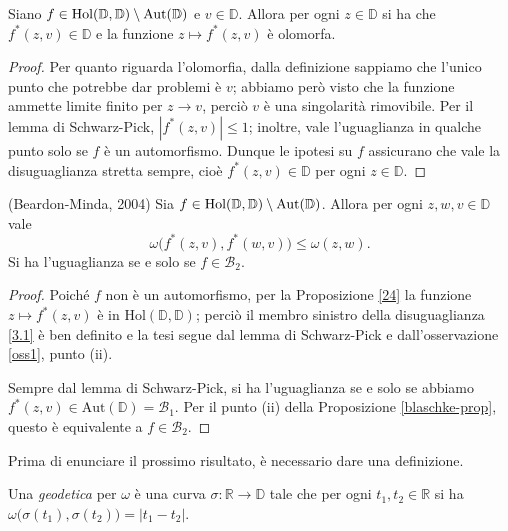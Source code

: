\begin{prop} \label{24}
  Siano $f \in \text{\normalfont{Hol}}(\mathbb{D},\mathbb{D})\setminus\text{\normalfont{Aut}}(\mathbb{D})$ e $v \in \mathbb{D}$. Allora per ogni $z \in \mathbb{D}$ si ha che $f^*(z,v) \in \mathbb{D}$ e la funzione $z \longmapsto f^*(z,v)$ è olomorfa.
\end{prop}

\begin{proof}
  Per quanto riguarda l'olomorfia, dalla definizione sappiamo che l'unico punto che potrebbe dar problemi è $v$; abbiamo però visto che la funzione ammette limite finito per $z \longrightarrow v$, perciò $v$ è una singolarità rimovibile. Per il lemma di Schwarz-Pick, $|f^*(z,v)| \le 1$; inoltre, vale l'uguaglianza in qualche punto solo se $f$ è un automorfismo. Dunque le ipotesi su $f$ assicurano che vale la disuguaglianza stretta sempre, cioè $f^*(z,v) \in \mathbb{D}$ per ogni $z \in \mathbb{D}$.
\end{proof}

\begin{thm} \label{31}
  (Beardon-Minda, 2004) Sia $f \in \text{\normalfont{Hol}}(\mathbb{D},\mathbb{D})\setminus\text{\normalfont{Aut}}(\mathbb{D})$. Allora per ogni $z, w, v \in \mathbb{D}$ vale
  \begin{equation} \label{3.1}
    \omega\bigl(f^*(z,v),f^*(w,v)\bigr) \le \omega(z,w).
  \end{equation}
  Si ha l'uguaglianza se e solo se $f \in \mathcal{B}_2$.
\end{thm}

\begin{proof}
  Poiché $f$ non è un automorfismo, per la Proposizione \ref{24} la funzione $z \longmapsto f^*(z,v)$ è in $\text{Hol}(\mathbb{D}, \mathbb{D})$; perciò il membro sinistro della disuguaglianza \eqref{3.1} è ben definito e la tesi segue dal lemma di Schwarz-Pick e dall'osservazione \ref{oss1}, punto (ii).

  Sempre dal lemma di Schwarz-Pick, si ha l'uguaglianza se e solo se abbiamo $f^*(z,v) \in \text{Aut}(\mathbb{D})=\mathcal{B}_1$. Per il punto (ii) della Proposizione \ref{blaschke-prop}, questo è equivalente a $f \in \mathcal{B}_2$.
\end{proof}

Prima di enunciare il prossimo risultato, è necessario dare una definizione.

\begin{defn}
  Una \textit{geodetica} per $\omega$ è una curva $\sigma: \mathbb{R} \longrightarrow \mathbb{D}$ tale che per ogni $t_1,t_2 \in \mathbb{R}$ si ha $\omega\bigl(\sigma(t_1),\sigma(t_2)\bigr)=|t_1-t_2|$.
\end{defn}


